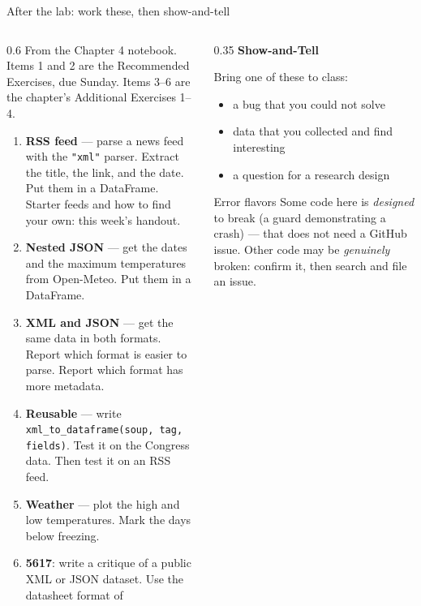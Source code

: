 \documentclass[9pt,aspectratio=169]{beamer}
\begin{document}
\begin{frame}{After the lab: work these, then show-and-tell}
    \begin{columns}[T]
        \begin{column}{0.6\textwidth}
            From the Chapter 4 notebook. Items 1 and 2 are the Recommended Exercises, due Sunday. Items 3--6 are the chapter's Additional Exercises 1--4.
            \begin{enumerate}\small
                \item \textbf{RSS feed} --- parse a news feed with the \texttt{"xml"} parser. Extract the title, the link, and the date. Put them in a DataFrame. \footnotesize Starter feeds and how to find your own: this week's handout.
                \item \textbf{Nested JSON} --- get the dates and the maximum temperatures from Open-Meteo. Put them in a DataFrame.
                \item \textbf{XML and JSON} --- get the same data in both formats. Report which format is easier to parse. Report which format has more metadata.
                \item \textbf{Reusable} --- write \texttt{xml\_to\_dataframe(soup, tag, fields)}. Test it on the Congress data. Then test it on an RSS feed.
                \item \textbf{Weather} --- plot the high and low temperatures. Mark the days below freezing.
                \item[6.] \textbf{5617}: write a critique of a public XML or JSON dataset. Use the datasheet format of \textcite{gebru2021datasheets}
            \end{enumerate}
        \end{column}
        \begin{column}{0.35\textwidth}
            \textbf{Show-and-Tell}\\[2pt]
            {\footnotesize Bring one of these to class:
            \begin{itemize}\footnotesize
                \item a bug that you could not solve
                \item data that you collected and find interesting
                \item a question for a research design
            \end{itemize}\par}
            \medskip
            \begin{alertblock}{Error flavors}
                \footnotesize Some code here is \textit{designed} to break (a guard demonstrating a crash) --- that does not need a GitHub issue. Other code may be \textit{genuinely} broken: confirm it, then search and file an issue.
            \end{alertblock}
        \end{column}
    \end{columns}
\end{frame}
\end{document}
